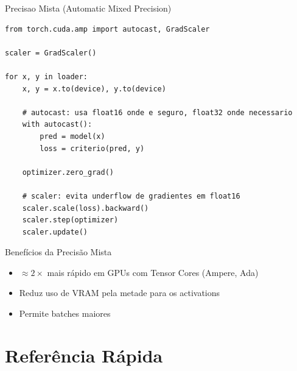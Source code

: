 \documentclass[aspectratio=169, 10pt]{beamer}
\begin{document}
\begin{frame}[fragile]{Precisao Mista (Automatic Mixed Precision)}
\begin{lstlisting}
from torch.cuda.amp import autocast, GradScaler

scaler = GradScaler()

for x, y in loader:
    x, y = x.to(device), y.to(device)

    # autocast: usa float16 onde e seguro, float32 onde necessario
    with autocast():
        pred = model(x)
        loss = criterio(pred, y)

    optimizer.zero_grad()

    # scaler: evita underflow de gradientes em float16
    scaler.scale(loss).backward()
    scaler.step(optimizer)
    scaler.update()
\end{lstlisting}

\begin{block}{Benefícios da Precisão Mista}
  \begin{itemize}
    \item $\approx 2\times$ mais rápido em GPUs com Tensor Cores (Ampere, Ada)
    \item Reduz uso de VRAM pela metade para os activations
    \item Permite batches maiores
  \end{itemize}
\end{block}
\end{frame}

\section{Referência Rápida}
\end{document}
